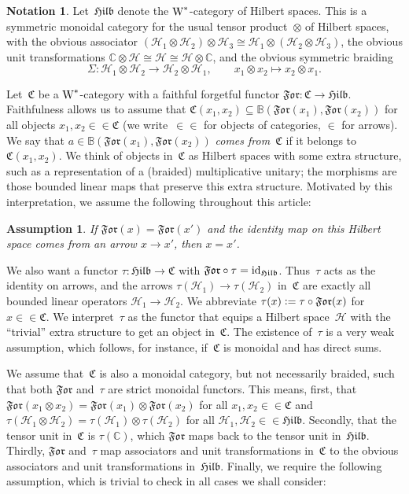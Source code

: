 \documentclass[a4paper]{amsart}
\numberwithin{equation}{section}
\theoremstyle{plain}
\numberwithin{theorem}{section}
\newtheorem{assumption}[theorem]{Assumption}
\theoremstyle{definition}
\newtheorem{notation}[theorem]{Notation}
\theoremstyle{remark}
\newcommand*{\inOb}{\mathrel{\in\in}}%
\newcommand*{\Cat}{\mathfrak C}     %
\newcommand*{\Hilb}{\mathfrak{Hilb}}%
\newcommand*{\Forget}{\mathfrak{For}}%
\newcommand*{\Trivial}{\tau}%
\newcommand*{\nb}{\nobreakdash}
\newcommand*{\C}{\mathbb C}
\newcommand*{\Bound}{\mathbb B}%
\newcommand*{\Id}{\textup{id}}%
\newcommand*{\Wst}{\textup W^*}%
\newcommand*{\Hils}[1][H]{\mathcal{#1}}%
\newcommand*{\defeq}{\mathrel{\vcentcolon=}}
\begin{document}
\begin{notation}
  Let~\(\Hilb\)
  denote the \(\Wst\)\nb-category
  of Hilbert spaces.  This is a symmetric monoidal category for the
  usual tensor product~\(\otimes\)
  of Hilbert spaces, with the obvious associator
  \((\Hils_1\otimes\Hils_2)\otimes\Hils_3 \cong
  \Hils_1\otimes(\Hils_2\otimes\Hils_3)\),
  the obvious unit transformations
  \(\C\otimes\Hils\cong\Hils\cong\Hils\otimes\C\),
  and the obvious symmetric braiding
  \[
  \Sigma\colon \Hils_1\otimes\Hils_2\to \Hils_2\otimes\Hils_1,\qquad
  x_1\otimes x_2\mapsto x_2\otimes x_1.
  \]
\end{notation}

Let~\(\Cat\)
be a \(\Wst\)\nb-category
with a faithful forgetful functor \(\Forget\colon \Cat\to\Hilb\).
Faithfulness allows us to assume that
\(\Cat(x_1,x_2) \subseteq \Bound(\Forget(x_1),\Forget(x_2))\)
for all objects \(x_1,x_2\inOb\Cat\)
(we write~\(\inOb\)
for objects of categories, \(\in\)
for arrows).  We say that \(a\in \Bound(\Forget(x_1),\Forget(x_2))\)
\emph{comes from~\(\Cat\)}
if it belongs to \(\Cat(x_1,x_2)\).
We think of objects in~\(\Cat\)
as Hilbert spaces with some extra structure, such as a
representation of a (braided) multiplicative unitary; the morphisms
are those bounded linear maps that preserve this extra structure.
Motivated by this interpretation, we assume the following throughout
this article:

\begin{assumption}
  \label{assum:identity_arrow_equal}
  If \(\Forget(x)=\Forget(x')\)
  and the identity map on this Hilbert space comes from an arrow
  \(x\to x'\), then \(x=x'\).
\end{assumption}

We also want a functor \(\Trivial\colon \Hilb\to\Cat\)
with \(\Forget\circ\Trivial=\Id_{\Hilb}\).
Thus~\(\Trivial\)
acts as the identity on arrows, and the arrows
\(\Trivial(\Hils_1)\to\Trivial(\Hils_2)\)
in~\(\Cat\)
are exactly all bounded linear operators \(\Hils_1\to\Hils_2\).
We abbreviate \(\Trivial(x) \defeq \Trivial\circ\Forget(x)\)
for \(x\inOb\Cat\).
We interpret~\(\Trivial\)
as the functor that equips a Hilbert space~\(\Hils\)
with the ``trivial'' extra structure to get an object in~\(\Cat\).
The existence of~\(\Trivial\)
is a very weak assumption, which follows, for instance, if~\(\Cat\)
is monoidal and has direct sums.

We assume that~\(\Cat\) is also a monoidal category, but not
necessarily braided, such that both \(\Forget\) and~\(\Trivial\) are
strict monoidal functors.  This means, first, that
\(\Forget(x_1\otimes x_2) = \Forget(x_1)\otimes\Forget(x_2)\) for
all \(x_1,x_2\inOb\Cat\) and \(\Trivial(\Hils_1\otimes\Hils_2) =
\Trivial(\Hils_1)\otimes\Trivial(\Hils_2)\) for all
\(\Hils_1,\Hils_2\inOb\Hilb\).  Secondly, that the tensor unit
in~\(\Cat\) is \(\Trivial(\C)\), which \(\Forget\) maps back to the
tensor unit in~\(\Hilb\).  Thirdly, \(\Forget\) and~\(\Trivial\) map
associators and unit transformations in~\(\Cat\) to the obvious
associators and unit transformations in~\(\Hilb\).
Finally, we require the following assumption, which is trivial to
check in all cases we shall consider:
\end{document}
